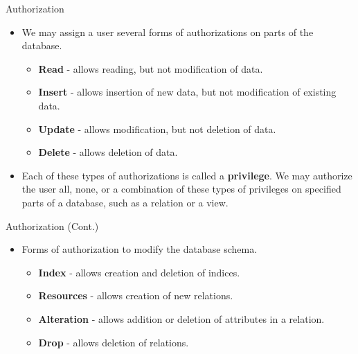 \documentclass{beamer}
\begin{document}
\begin{frame}{Authorization}
    \begin{itemize}
        \item We may assign a user several forms of authorizations on parts of the database.
        \begin{itemize}
            \item \textbf{Read} - allows reading, but not modification of data.
            \item \textbf{Insert} - allows insertion of new data, but not modification of existing data.
            \item \textbf{Update} - allows modification, but not deletion of data.
            \item \textbf{Delete} - allows deletion of data.
        \end{itemize}
        \item Each of these types of authorizations is called a \textbf{privilege}.  We may authorize the user all, none, or a combination of these types of privileges on specified parts of a database, such as a relation or a view.
    \end{itemize}
\end{frame}

\begin{frame}{Authorization (Cont.)}
    \begin{itemize}
        \item Forms of authorization to modify the database schema.
        \begin{itemize}
            \item \textbf{Index} - allows creation and deletion of indices.
            \item \textbf{Resources} - allows creation of new relations.
            \item \textbf{Alteration} - allows addition or deletion of attributes in a relation.
            \item \textbf{Drop} - allows deletion of relations.
        \end{itemize}
    \end{itemize}
\end{frame}
\end{document}
